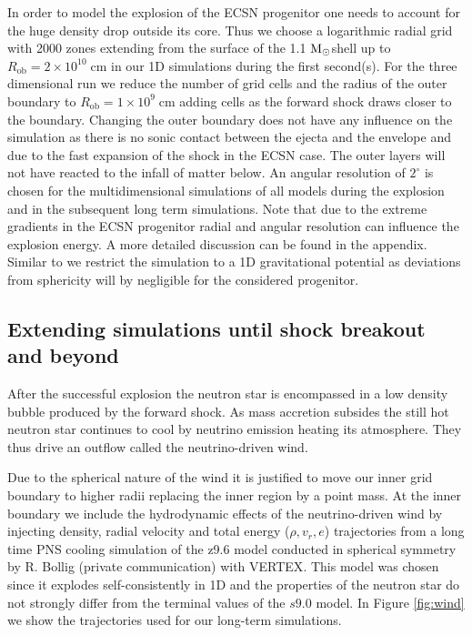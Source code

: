 \documentclass[fleqn,usenatbib]{mnras}
\newcommand{\solm}{\xspace\ensuremath{\rm{M_{\odot}}}}
\newcommand{\vertex}{\textsc{V{\footnotesize ERTEX}}\xspace}
\begin{document}
In order to model the explosion of the ECSN progenitor one needs to account for the huge density drop outside its core. Thus we choose a logarithmic radial grid with 2000 zones extending from the surface of  the 1.1 \solm shell up to $R_{\mathrm{ob}}=2\times 10^{10}\;\mathrm{cm}$ in our 1D simulations during the first second(s). 
For the three dimensional run we reduce the number of grid cells and the radius of the outer boundary to $R_{\mathrm{ob}}=1\times 10^{9}\;\mathrm{cm}$ adding cells as the forward shock draws closer to the boundary.
Changing the outer boundary does not have any influence on the simulation as there is no sonic contact between the ejecta and the envelope and due to the fast expansion of the shock in the ECSN case. The outer layers will not have reacted to the infall of matter below. 
An angular resolution of $2^{\circ}$ is chosen for the multidimensional simulations of all models during the explosion and in the subsequent long term simulations.
Note that due to the extreme gradients in the ECSN progenitor radial and angular resolution can influence the explosion energy. A more detailed discussion can be found in the appendix.
Similar to \cite{Gessner2018} we restrict the simulation to a 1D gravitational potential as deviations from sphericity will by negligible for the considered progenitor.

\subsection{Extending simulations until shock breakout and beyond}

After the successful explosion the neutron star is encompassed in a low density bubble produced by the forward shock. As mass accretion subsides the still hot neutron star continues to cool by neutrino emission heating its atmosphere. They thus drive an outflow called the neutrino-driven wind. 

Due to the spherical nature of the wind it is justified to move our inner grid boundary to higher radii replacing the inner region by a point mass. At the inner boundary we include the hydrodynamic effects of the neutrino-driven wind by injecting density, radial velocity and total energy ($\rho,v_r,e$) trajectories from a long time PNS cooling simulation of the z9.6 model conducted in spherical symmetry by R. Bollig (private communication) with \vertex. This model was chosen since it explodes self-consistently in 1D and the properties of the neutron star do not strongly differ from the terminal values of the $s9.0$ model. In Figure \ref{fig:wind} we show the trajectories used for our long-term simulations.
\end{document}
